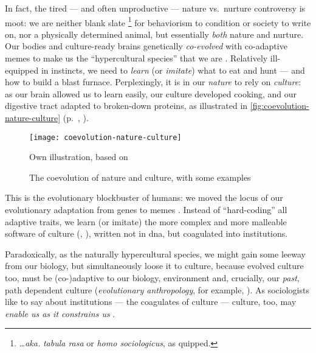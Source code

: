 In fact, the tired --- and often unproductive --- nature vs.\ nurture controversy is moot:
we are neither blank slate
\footnote{
	\ldots \emph{aka.} \emph{tabula rasa} or \emph{homo sociologicus}, as \cite{Dahrendorf1965} quipped.
}
for behaviorism to condition or society to write on, nor a physically determined animal, but essentially \emph{both} nature and nurture.
Our bodies and culture-ready brains genetically \emph{co-evolved} with co-adaptive memes \citep{Dawkins1976} to make us the ``hypercultural species'' that we are \citep[K175]{Henrich2007}.
Relatively ill-equipped in instincts, we need to \emph{learn} (or \emph{imitate}) what to eat and hunt --- and how to build a blast furnace.
Perplexingly, it is in our \emph{nature} to rely on \emph{culture}:
as our brain allowed us to learn easily, our culture developed cooking, and our digestive tract adapted to broken-down proteins, as illustrated in \autoref{fig:coevolution-nature-culture} (p.~\pageref{fig:coevolution-nature-culture}, \citealt[confer][]{Henrich2007}).

\begin{figure}[htbp]
	\begin{center}
	\texttt{[image: coevolution-nature-culture]}
	\caption[Coevolution of Nature and Culture]{The coevolution of nature and culture, with some examples}
	\end{center}
	\scriptsize{Own illustration, based on \citet[K120ff]{Henrich2007}}
	\label{fig:coevolution-nature-culture}
\end{figure}

This is the evolutionary blockbuster of humans:
we moved the locus of our evolutionary adaptation from genes to memes \citep{Dawkins1976}.
Instead of ``hard-coding'' all adaptive traits, we learn (or imitate) the more complex and more malleable software of culture (\citealt{Boyd1985}, \citealt[K196ff]{Henrich2007}), written not in \gls{dna}, but coagulated into institutions.

Paradoxically, as the naturally hypercultural species, we might gain some leeway from our biology, but simultaneously loose it to culture, because evolved culture too, must be (co-)adaptive to our biology, environment and, crucially, our \emph{past}, path dependent culture (\emph{evolutionary anthropology}, for example, \citealt{Wright2000}).
As sociologists like to say about institutions --- the coagulates of culture --- culture, too, may \emph{enable us as it constrains us} \citep[for example,][3]{Hodgson2006}.

